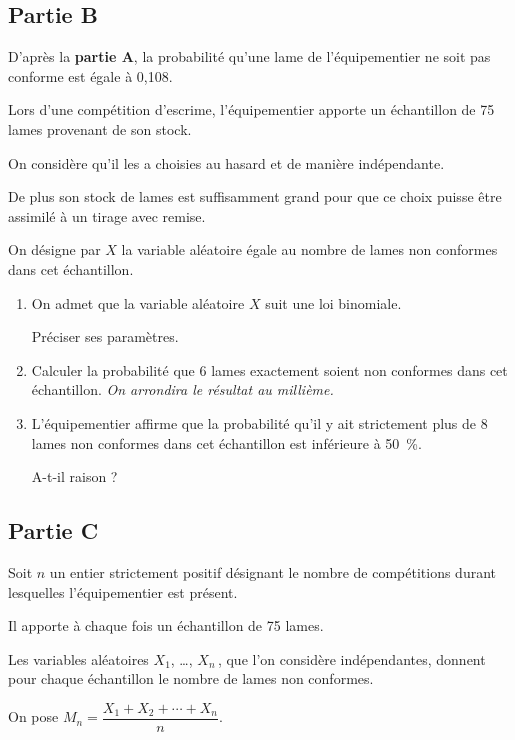 	\subsection*{Partie B}
	D'après la \textbf{partie A}, la probabilité qu'une lame de l'équipementier ne soit pas conforme est égale à 0,108.
	
	Lors d'une compétition d'escrime, l'équipementier apporte un échantillon de 75 lames provenant de son stock.
	
	On considère qu'il les a choisies au hasard et de manière indépendante.
	
	De plus son stock de lames est suffisamment grand pour que ce choix puisse être assimilé à un tirage avec remise.
	
	On désigne par $X$ la variable aléatoire égale au nombre de lames non conformes dans cet échantillon.
	
	\begin{enumerate}
		\item On admet que la variable aléatoire $X$ suit une loi binomiale.
		
		Préciser ses paramètres.
		
		\item Calculer la probabilité que 6 lames exactement soient non conformes dans cet échantillon. \emph{On arrondira le résultat au millième.}
		
		\item L'équipementier affirme que la probabilité qu'il y ait strictement plus de 8 lames non conformes dans cet échantillon est inférieure à 50~\%.
		
		A-t-il raison ?
	\end{enumerate}
	
	\subsection*{Partie C}
	Soit $n$ un entier strictement positif désignant le nombre de compétitions durant lesquelles l'équipementier est présent.
	
	Il apporte à chaque fois un échantillon de 75 lames.
	
	Les variables aléatoires $X_{1}$, \ldots, $X_{n}$\,, que l'on considère indépendantes, donnent pour chaque échantillon le nombre de lames non conformes.
	
	\smallskip
	
	On pose \quad $M_{n}=\dfrac{X_{1}+X_{2}+\cdots+X_{n}}{n}$.
	
